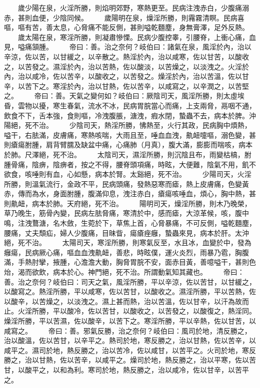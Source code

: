 　　歲少陽在泉，火淫所勝，則焰明郊野，寒熱更至。民病注洩赤白，少腹痛溺赤，甚則血便，少陰同候。
　　歲陽明在泉，燥淫所勝，則霿霧清瞑。民病喜嘔，嘔有苦，善太息，心脅痛不能反側，甚則嗌乾麵塵，身無膏澤，足外反熱。
　　歲太陽在泉，寒淫所勝，則凝肅慘慄。民病少腹控睾，引腰脊，上衝心痛，血見，嗌痛頷腫。
　　帝曰：善。治之奈何？岐伯曰：諸氣在泉，風淫於內，治以辛涼，佐以苦，以甘緩之，以辛散之。熱淫於內，治以咸寒，佐以甘苦，以酸收之，以苦發之。濕淫於內，治以苦熱，佐以酸淡，以苦燥之，以淡洩之。火淫於內，治以咸冷，佐以苦辛，以酸收之，以苦發之。燥淫於內，治以苦溫，佐以甘辛，以苦下之。寒淫於內，治以甘熱，佐以苦辛，以咸寫之，以辛潤之，以苦堅之。
　　帝曰：善。天氣之變何如？岐伯曰：厥陰司天，風淫所勝，則太虛埃昏，雲物以擾，寒生春氣，流水不冰，民病胃脘當心而痛，上支兩脅，鬲咽不通，飲食不下，舌本強，食則嘔，冷洩腹脹，溏洩，瘕水閉，蟄蟲不去，病本於脾。沖陽絕，死不治。
　　少陰司天，熱淫所勝，怫熱至，火行其政，民病胸中煩熱，嗌干，右胠滿，皮膚痛，寒熱咳喘，大雨且至，唾血血洩，鼽衄嚏嘔，溺色變，甚則瘡瘍胕腫，肩背臂臑及缺盆中痛，心痛肺（月真），腹大滿，膨膨而喘咳，病本於肺。尺澤絕，死不治。
　　太陰司天，濕淫所勝，則沉陰且布，雨變枯槁，胕腫骨痛，陰痹，陰痹者，按之不得，腰脊頭項痛，時眩，大便難，陰氣不用，飢不欲食，咳唾則有血，心如懸，病本於腎。太谿絕，死不治。
　　少陽司天，火淫所勝，則溫氣流行，金政不平，民病頭痛，發熱惡寒而瘧，熱上皮膚痛，色變黃赤，傳而為水，身面胕腫，腹滿仰息，洩注赤白，瘡瘍咳唾血，煩心，胸中熱，甚則鼽衄，病本於肺。天府絕，死不治。
　　陽明司天，燥淫所勝，則木乃晚榮，草乃晚生，筋骨內變，民病左胠脅痛，寒清於中，感而瘧，大涼革候，咳，腹中鳴，注洩鶩溏，名木斂，生菀於下，草焦上首，心脅暴痛，不可反側，嗌乾麵塵，腰痛，丈夫頹疝，婦人少腹痛，目昧眥，瘍瘡痤癰，蟄蟲來見，病本於肝。太沖絕，死不治。
　　太陽司天，寒淫所勝，則寒氣反至，水且冰，血變於中，發為癰瘍，民病厥心痛，嘔血血洩鼽衄，善悲，時眩僕，運火炎烈，雨暴乃雹，胸腹滿，手熱肘攣，掖腫，心澹澹大動，胸脅胃脘不安，面赤目黃，善噫嗌干，甚則色炲，渴而欲飲，病本於心。神門絕，死不治。所謂動氣知其藏也。
　　帝曰：善。治之奈何？岐伯曰：司天之氣，風淫所勝，平以辛涼，佐以苦甘，以甘緩之，以酸寫之。熱淫所勝，平以咸寒，佐以苦甘，以酸收之。濕淫所勝，平以苦熱，佐以酸辛，以苦燥之，以淡洩之。濕上甚而熱，治以苦溫，佐以甘辛，以汗為故而止。火淫所勝，平以酸冷，佐以苦甘，以酸收之，以苦發之，以酸復之，熱淫同。燥淫所勝，平以苦濕，佐以酸辛，以苦下之。寒淫所勝，平以辛熱，佐以甘苦，以咸寫之。
　　帝曰：善。邪氣反勝，治之奈何？岐伯曰：風司於地，清反勝之，治以酸溫，佐以苦甘，以辛平之。熱司於地，寒反勝之，治以甘熱，佐以苦辛，以咸平之。濕司於地，熱反勝之，治以苦冷，佐以咸甘，以苦平之。火司於地，寒反勝之，治以甘熱，佐以苦辛，以咸平之。燥司於地，熱反勝之，治以平寒，佐以苦甘，以酸平之，以和為利。寒司於地，熱反勝之，治以咸冷，佐以甘辛，以苦平之。
